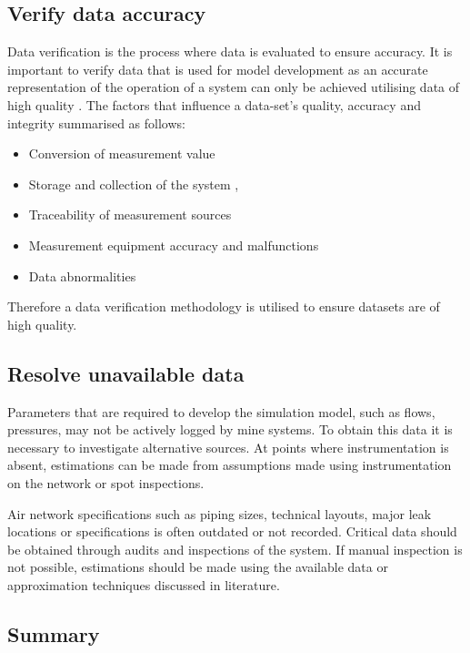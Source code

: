 	\subsection{Verify data accuracy}
	Data verification is the process where data is evaluated to ensure accuracy. It is important to verify data that is used for model development as an accurate representation of the operation of a system can only be achieved utilising data of high quality \cite{gous2016data}. The factors that influence a data-set's quality, accuracy and integrity  summarised as follows:
	\begin{itemize}
		\item Conversion of measurement value \cite{meijsen2015verification}
		\item Storage and collection of the system \cite{vanNiekerk2016quantification},\cite{Jansevan2016structuring}
		\item Traceability of measurement sources \cite{Jansevan2016structuring}
		\item Measurement equipment accuracy and malfunctions \cite{gous2016data}
		\item Data abnormalities \cite{gous2016data}
	\end{itemize} 
	\par 
	Therefore a data verification methodology is utilised to ensure datasets are of high quality. 
	\subsection{Resolve unavailable data}
		Parameters that are required to develop the simulation model, such as flows, pressures, may not be actively logged by mine systems. To obtain this data it is necessary to investigate alternative sources. At points where instrumentation is absent, estimations can be made from assumptions made using instrumentation on the network or spot inspections.
		\par 
		Air network specifications such as piping sizes, technical layouts, major leak locations or specifications is often outdated or not recorded. Critical data should be obtained through audits and inspections of the system. If manual inspection is not possible, estimations should be made using the available data or approximation techniques discussed in literature. %
	
	\subsection{Summary}
\newpage	
